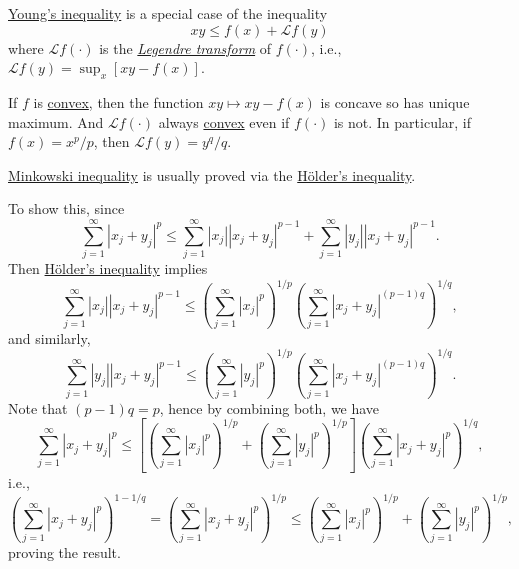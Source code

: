 \begin{remark}
	\href{https://en.wikipedia.org/wiki/Young's_inequality_for_products}{Young's inequality} is a special case of the inequality
	\[
		xy \leq f(x) + \mathcal{L} f(y)
	\]
	where \(\mathcal{L} f(\cdot)\) is the \href{https://en.wikipedia.org/wiki/Legendre_transformation}{\emph{Legendre transform}} of \(f(\cdot)\), i.e., \(\mathcal{L} f(y) = \sup _x \left[ xy - f(x) \right]\).

	If \(f\) is \hyperref[def:convex-function]{convex}, then the function \(xy\mapsto xy - f(x)\) is concave so has unique maximum. And \(\mathcal{L} f(\cdot)\) always \hyperref[def:convex-function]{convex} even if \(f(\cdot)\) is not. In particular, if \(f(x) = x^p / p\), then \(\mathcal{L} f(y) = y^q / q\).
\end{remark}

\begin{note}
	\hyperref[lma:Minkowski-ineq]{Minkowski inequality} is usually proved via the \hyperref[lma:Holder-ineq]{Hölder's inequality}.
\end{note}
\begin{explanation}
	To show this, since
	\[
		\sum_{j=1}^{\infty} \left\vert x_j + y_j \right\vert ^p \leq \sum_{j=1}^{\infty} \left\vert x_{j}  \right\vert \left\vert x_{j} +y_{j}  \right\vert ^{p - 1} + \sum_{j=1}^{\infty} \left\vert y_{j}  \right\vert \left\vert x_{j} +y_{j}  \right\vert ^{p-1}.
	\]
	Then \hyperref[lma:Holder-ineq]{Hölder's inequality} implies
	\[
		\sum_{j=1}^{\infty} \left\vert x_{j}  \right\vert \left\vert x_{j} + y_{j}  \right\vert ^{p-1}\leq \left( \sum_{j=1}^{\infty} \left\vert x_{j}  \right\vert^p \right) ^{1 / p} \left( \sum_{j=1}^{\infty} \left\vert x_{j} +y_{j}  \right\vert^{(p - 1)q}  \right) ^{1 / q},
	\]
	and similarly,
	\[
		\sum_{j=1}^{\infty} \left\vert y_{j}  \right\vert \left\vert x_{j} + y_{j}  \right\vert ^{p-1}\leq \left( \sum_{j=1}^{\infty} \left\vert y_{j}  \right\vert^p \right) ^{1 / p} \left( \sum_{j=1}^{\infty} \left\vert x_{j} +y_{j}  \right\vert^{(p - 1)q}  \right) ^{1 / q}.
	\]
	Note that \((p-1)q = p\), hence by combining both, we have
	\[
		\sum_{j=1}^{\infty} \left\vert x_j + y_j \right\vert ^p \leq
		\left[ \left( \sum_{j=1}^{\infty} \left\vert x_{j}  \right\vert^p \right) ^{1 / p}
			+ \left( \sum_{j=1}^{\infty} \left\vert y_{j}  \right\vert^p \right) ^{1 / p} \right] \left( \sum_{j=1}^{\infty} \left\vert x_{j} +y_{j}  \right\vert^{p}  \right) ^{1 / q},
	\]
	i.e.,
	\[
		\left( \sum_{j=1}^{\infty} \left\vert x_j + y_j \right\vert ^p \right) ^{1 - 1 / q}
		= \left( \sum_{j=1}^{\infty} \left\vert x_j + y_j \right\vert ^p \right) ^{1 / p}
		\leq
		\left( \sum_{j=1}^{\infty} \left\vert x_{j}  \right\vert^p \right) ^{1 / p}
		+ \left( \sum_{j=1}^{\infty} \left\vert y_{j}  \right\vert^p \right) ^{1 / p},
	\]
	proving the result.
\end{explanation}

